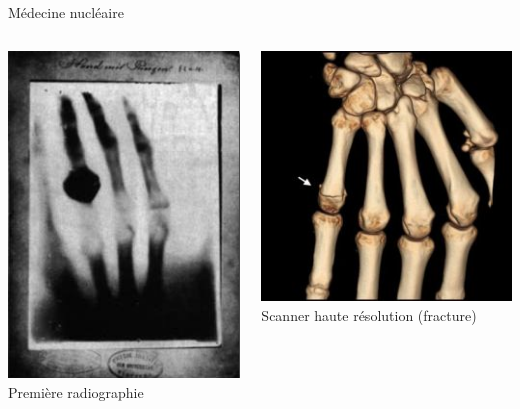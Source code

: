\documentclass{beamer}
\begin{document}
\begin{frame}{Médecine nucléaire}
\begin{columns}[T]
 \begin{column}{0.5\textwidth}
 \centering
\includegraphics[height=0.7\textheight]{images/main_roentgen.jpg}\\
Première radiographie
 \end{column}
 \begin{column}{0.5\textwidth}
 \centering
\includegraphics[height=0.5\textheight]{images/main_TDM.jpg}\\
Scanner haute résolution (fracture)
 \end{column}
\end{columns}
\end{frame}
\end{document}
